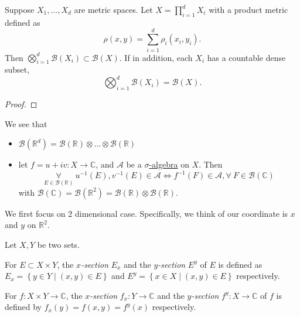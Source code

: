 \begin{theorem}
	Suppose \(X_1, \dots , X_d \) are metric spaces. Let \(X = \prod_{i=1}^{d} X_{i}\) with a product metric defined as
	\[
		\rho (x, y) = \sum_{i=1}^{d} \rho _{i}(x_{i}, y_{i}).
	\]
	Then \(\bigotimes_{i=1}^{d}\mathcal{B} (X_{i})\subset \mathcal{B} (X)\). If in addition, each \(X_{i}\) has a countable dense subset,
	\[
		\bigotimes_{i=1}^{d}\mathcal{B} (X_{i}) = \mathcal{B} (X).
	\]
\end{theorem}
\begin{proof}
\end{proof}

\begin{remark}
	We see that
	\begin{itemize}
		\item \(\mathcal{B} (\mathbb{R} ^d) = \mathcal{B} (\mathbb{R} )\otimes \dots \otimes \mathcal{B} (\mathbb{R} ) \)
		\item let \(f = u + iv\colon X\to \mathbb{C} \), and \(\mathcal{A} \) be a \hyperref[def:sigma-algebra]{\(\sigma\)-algebra} on \(X\). Then
		      \[
			      \underset{E\in \mathcal{B} (\mathbb{R} )}{\forall }\ u^{-1} (E), v^{-1} (E)\in \mathcal{A}
			      \iff
			      f^{-1} (F)\in \mathcal{A}, \forall\ F\in \mathcal{B} (\mathbb{C} )
		      \]
		      with \(\mathcal{B} (\mathbb{C} ) = \mathcal{B} (\mathbb{R} ^2) = \mathcal{B} (\mathbb{R} )\otimes \mathcal{B} (\mathbb{R} )\).
	\end{itemize}
\end{remark}

We first focus on \(2\) dimensional case. Specifically, we think of our coordinate is \(x\) and \(y\) on \(\mathbb{R} ^2\).

\begin{definition*}
	Let \(X, Y\) be two sets.

	\begin{definition}
		For \(E\subset X\times Y\), the \emph{\(x\)-section} \(E_x\) and the \emph{\(y\)-section} \(E^y\) of \(E\) is defined as \(E_x = \left\{y\in Y \mid (x, y)\in E\right\} \) and \(E^y = \left\{x\in X \mid (x, y)\in E\right\}\) respectively.
	\end{definition}

	\begin{definition}
		For \(f\colon X\times Y\to \mathbb{C} \), the \emph{\(x\)-section} \(f_x\colon Y\to \mathbb{C}\) and the \emph{\(y\)-section} \(f^y\colon X\to \mathbb{C}\) of \(f\) is defined by \(f_x(y) = f(x, y) = f^y(x)\) respectively.
	\end{definition}
\end{definition*}

